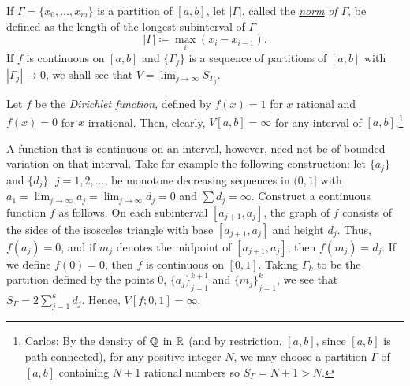 If $\Gamma=\{x_0,\dotsc,x_m\}$ is a partition of $[a,b]$, let $|\Gamma|$,
called the
\href{https://en.wikipedia.org/wiki/Partition_of_an_interval#Norm_of_a_partition}{\emph{norm}}
\emph{of $\Gamma$}, be defined as the length of the longest subinterval of
$\Gamma$
\begin{equation}
\label{eq:bv:partition-norm}
|\Gamma|\coloneqq\max_{i}(x_i-x_{i-1}).
\end{equation}
If $f$ is continuous on $[a,b]$ and $\{\Gamma_j\}$ is a sequence of
partitions of $[a,b]$ with $|\Gamma_j|\to 0$, we shall see that
$V=\lim_{j\to\infty} S_{\Gamma_j}$.

\begin{example}
Let $f$ be the
\href{https://en.wikipedia.org/wiki/Dirichlet_function}{\emph{Dirichlet
    function}}, defined by $f(x)=1$ for $x$ rational and $f(x)=0$ for $x$
irrational. Then, clearly, $V[a,b]=\infty$ for any interval of
$[a,b]$.\footnote{Carlos: By the density of $\mathbb{Q}$ in $\mathbb{R}$ (and by
  restriction, $[a,b]$, since $[a,b]$ is path-connected), for any
  positive integer $N$, we may choose a partition $\Gamma$ of $[a,b]$
  containing $N+1$ rational numbers so $S_\Gamma=N+1>N$.}
\end{example}

\begin{example}
A function that is continuous on an interval, however, need not be of
bounded variation on that interval. Take for example the following
construction: let $\{a_j\}$ and $\{d_j\}$, $j=1,2,\dotsc$, be monotone
decreasing sequences in $(0,1]$ with $a_1=\lim_{j\to\infty}
a_j=\lim_{j\to\infty}d_j=0$ and $\sum d_j=\infty$. Construct a continuous
function $f$ as follows. On each subinterval $[a_{j+1},a_j]$, the graph of
$f$ consists of the sides of the isosceles triangle with base
$[a_{j+1},a_j]$ and height $d_j$. Thus, $f(a_j)=0$, and if $m_j$ denotes
the midpoint of $[a_{j+1},a_j]$, then $f(m_j)=d_j$. If we define $f(0)=0$,
then $f$ is continuous on $[0,1]$. Taking $\Gamma_k$ to be the partition
defined by the points $0$, ${\{a_j\}}_{j=1}^{k+1}$ and ${\{m_j\}}_{j=1}^k$,
we see that $S_\Gamma=2\sum_{j=1}^k d_j$. Hence, $V[f;0,1]=\infty$.
\end{example}

